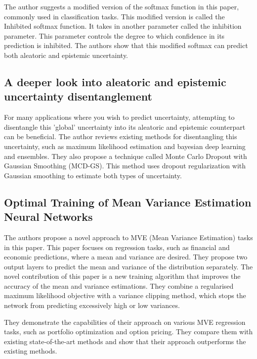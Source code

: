 \documentclass[10pt]{article}
\begin{document}
The author suggests a modified version of the softmax function in this paper, commonly used in classification tasks. This modified version is called the Inhibited softmax function. It takes in another parameter called the inhibition parameter. This parameter controls the degree to which confidence in its prediction is inhibited. The authors show that this modified softmax can predict both aleatoric and epistemic uncertainty.

\subsection*{A deeper look into aleatoric and epistemic uncertainty disentanglement \cite{valdenegro2022deeper}}

For many applications where you wish to predict uncertainty, attempting to disentangle this 'global' uncertainty into its aleatoric and epistemic counterpart can be beneficial. The author reviews existing methods for disentangling this uncertainty, such as maximum likelihood estimation and bayesian deep learning and ensembles. They also propose a technique called Monte Carlo Dropout with Gaussian Smoothing (MCD-GS). This method uses dropout regularization with Gaussian smoothing to estimate both types of uncertainty. 

\subsection*{Optimal Training of Mean Variance Estimation Neural Networks \cite{sluijterman2023optimal}}

The authors propose a novel approach to MVE (Mean Variance Estimation) tasks in this paper. This paper focuses on regression tasks, such as financial and economic predictions, where a mean and variance are desired. They propose two output layers to predict the mean and variance of the distribution separately. The novel contribution of this paper is a new training algorithm that improves the accuracy of the mean and variance estimations. They combine a regularised maximum likelihood objective with a variance clipping method, which stops the network from predicting excessively high or low variances. 

They demonstrate the capabilities of their approach on various MVE regression tasks, such as portfolio optimization and option pricing. They compare them with existing state-of-the-art methods and show that their approach outperforms the existing methods.
\end{document}

